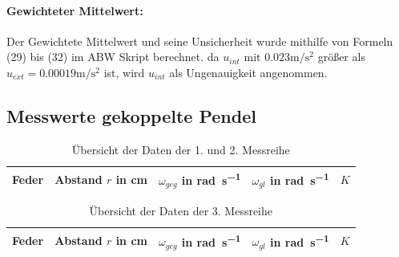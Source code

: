 \documentclass[11pt, a4paper]{article}
\begin{document}
    \paragraph{Gewichteter Mittelwert:}
    Der Gewichtete Mittelwert und seine Unsicherheit wurde mithilfe von
    Formeln (29) bis (32) im ABW Skript\cite{ABW} berechnet. da $u_{int}$ mit $0.023\si{\metre\per\square\second}$
    größer als $u_{ext} = 0.00019\si{\metre\per\square\second}$ ist, wird $u_{int}$ als Ungenauigkeit angenommen.

    \subsection{Messwerte gekoppelte Pendel} \label{kmess}

    \begin{table}[H]
        \label{mess1}
        \centering
        \begin{tabular}{c c c c c}
            Feder & Abstand $r$ in \si{\centi\metre} & $\omega_{geg}$ in \si{\radian\per\second} &
            $\omega_{gl}$ in \si{\radian\per\second} & $K$ \\ \hline
            
            
        \end{tabular}
        \caption{Übersicht der Daten der 1. und 2. Messreihe}
    \end{table}

    \begin{table}[H]
        \label{mess2}
        \centering
        \begin{tabular}{c c c c c}
            Feder & Abstand $r$ in \si{\centi\metre} & $\omega_{geg}$ in \si{\radian\per\second} &
            $\omega_{gl}$ in \si{\radian\per\second} & $K$ \\ \hline
            
            
        \end{tabular}
        \caption{Übersicht der Daten der 3. Messreihe}
    \end{table}


    
    
\end{document}
